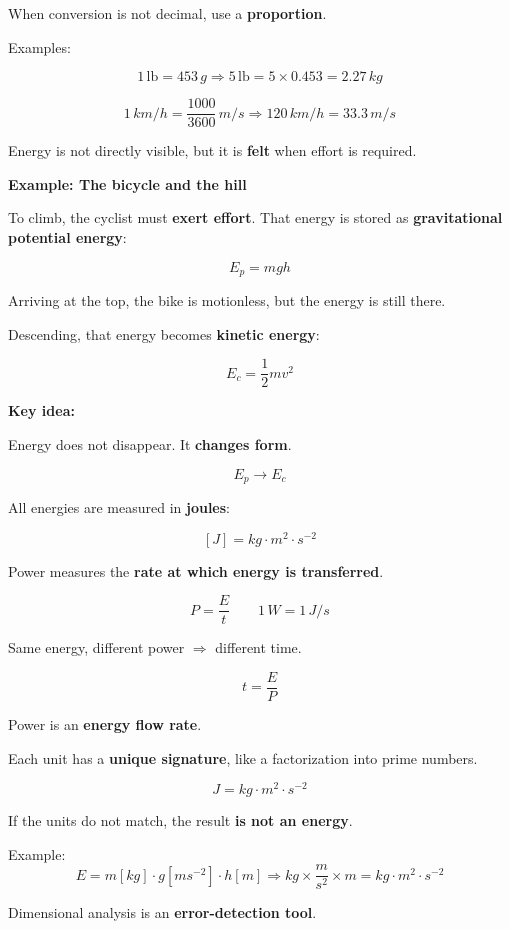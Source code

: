 \documentclass[11pt,a4paper]{article}
\newcommand{\theorybox}[2]{
\begin{tcolorbox}[title=\textbf{#1}]
#2
\end{tcolorbox}
}
\begin{document}
\theorybox{F - Conversion by proportion (general case)}{
When conversion is not decimal, use a \textbf{proportion}.

Examples:

\[
1\,\text{lb} = 453\,\si{g}
\Rightarrow
5\,\text{lb} = 5 \times 0.453 = 2.27\,\si{kg}
\]

\[
1\,\si{km/h} = \frac{1000}{3600}\,\si{m/s}
\Rightarrow
120\,\si{km/h} = 33.3\,\si{m/s}
\]
}

\theorybox{G - Definition of energy (physical intuition)}{
Energy is not directly visible, but it is \textbf{felt} when effort is required.

\textbf{Example: The bicycle and the hill}

To climb, the cyclist must \textbf{exert effort}.  
That energy is stored as \textbf{gravitational potential energy}:

\[
E_p = m g h
\]

Arriving at the top, the bike is motionless, but the energy is still there.

Descending, that energy becomes \textbf{kinetic energy}:

\[
E_c = \frac{1}{2} m v^2
\]

\textbf{Key idea:}

Energy does not disappear.  
It \textbf{changes form}.

\[
E_p \longrightarrow E_c
\]

All energies are measured in \textbf{joules}:

\[
[J] = kg \cdot m^2 \cdot s^{-2}
\]
}

\theorybox{H - Definition of power (physical intuition)}{
Power measures the \textbf{rate at which energy is transferred}.

\[
P = \frac{E}{t}
\qquad
1\,\si{W} = 1\,\si{J/s}
\]

Same energy, different power $\Rightarrow$ different time.

\[
t = \frac{E}{P}
\]

Power is an \textbf{energy flow rate}.
}

\theorybox{I - Dimensional analysis (unit signature)}{
Each unit has a \textbf{unique signature}, like a factorization into prime numbers.

\[
J = kg \cdot m^2 \cdot s^{-2}
\]

If the units do not match, the result \textbf{is not an energy}.  

Example:
\[
E = m[kg]\cdot g[ms^{-2}]\cdot h[m]
\Rightarrow
kg \times \frac{m}{s^2} \times m = kg \cdot m^2 \cdot s^{-2}
\]

Dimensional analysis is an \textbf{error-detection tool}.
}
\end{document}
